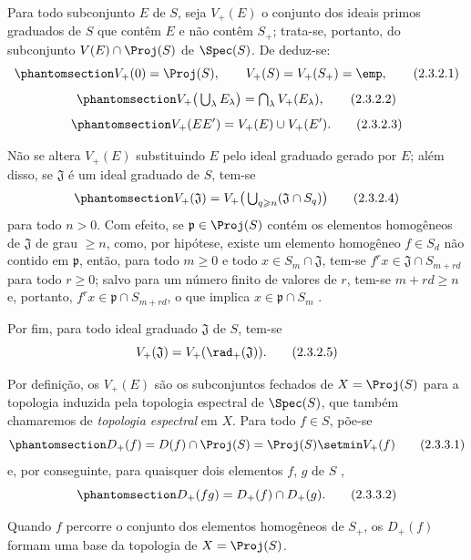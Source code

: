 \documentclass[oneside,10pt]{amsart}
\renewcommand{\geq}{\geqslant}
\newcommand{\oldpage}[2][]{\marginnote{\normalfont\footnotesize\textbf{#1}~|~#2}\ignorespaces}
\let\EGAOriginalLabel\label
\renewcommand{\label}[1]{\phantomsection\EGAOriginalLabel{#1}}
\begin{document}
\begin{env}[2.3.2]
\label{II.2.3.2}
Para todo subconjunto $E$ de $S$, seja $V_+(E)$ o conjunto dos ideais primos graduados de $S$ que contêm $E$ e não contêm $S_+$; trata-se, portanto, do subconjunto $V(E)\cap\Proj(S)$ de $\Spec(S)$.
De  deduz-se:
\[
\label{II.2.3.2.1}
  V_+(0)=\Proj(S),\qquad V_+(S)=V_+(S_+)=\emp,
\tag{2.3.2.1}
\]
\[
\label{II.2.3.2.2}
  V_+\big(\textstyle\bigcup_\lambda E_\lambda\big)
  =\textstyle\bigcap_\lambda V_+(E_\lambda),
\tag{2.3.2.2}
\]
\[
\label{II.2.3.2.3}
  V_+(EE')=V_+(E)\cup V_+(E').
\tag{2.3.2.3}
\]

Não se altera $V_+(E)$ substituindo $E$ pelo ideal graduado gerado por $E$; além disso, se $\mathfrak{J}$ é um ideal graduado de $S$, tem-se
\[
\label{II.2.3.2.4}
  V_+(\mathfrak{J})
  =V_+\big(\textstyle\bigcup_{q\geq n}(\mathfrak{J}\cap S_q)\big)
\tag{2.3.2.4}
\]
\oldpage[II]{26}
para todo $n>0$.
Com efeito, se $\mathfrak{p}\in\Proj(S)$ contém os elementos homogêneos de $\mathfrak{J}$ de grau $\geq n$, como, por hipótese, existe um elemento homogêneo $f\in S_d$ não contido em $\mathfrak{p}$, então, para todo $m\geq0$ e todo $x\in S_m\cap\mathfrak{J}$, tem-se $f^rx\in\mathfrak{J}\cap S_{m+rd}$ para todo $r\geq0$; salvo para um número finito de valores de $r$, tem-se $m+rd\geq n$ e, portanto, $f^rx\in\mathfrak{p}\cap S_{m+rd}$, o que implica $x\in\mathfrak{p}\cap S_m$ .

Por fim, para todo ideal graduado $\mathfrak{J}$ de $S$, tem-se
\[
  V_+(\mathfrak{J})=V_+(\rad_+(\mathfrak{J})).
\tag{2.3.2.5}
\]
\end{env}

\begin{env}[2.3.3]
\label{II.2.3.3}
Por definição, os $V_+(E)$ são os subconjuntos fechados de $X=\Proj(S)$ para a topologia induzida pela topologia espectral de $\Spec(S)$, que também chamaremos de \emph{topologia espectral} em $X$.
Para todo $f\in S$, põe-se
\[
\label{II.2.3.3.1}
  D_+(f)=D(f)\cap\Proj(S)=\Proj(S)\setmin V_+(f)
\tag{2.3.3.1}
\]
e, por conseguinte, para quaisquer dois elementos $f$, $g$ de $S$ ,
\[
\label{II.2.3.3.2}
  D_+(fg)=D_+(f)\cap D_+(g).
\tag{2.3.3.2}
\]
\end{env}

\begin{proposition}[2.3.4]
\label{II.2.3.4}
Quando $f$ percorre o conjunto dos elementos homogêneos de $S_+$, os $D_+(f)$ formam uma base da topologia de $X=\Proj(S)$.
\end{proposition}
\end{document}
